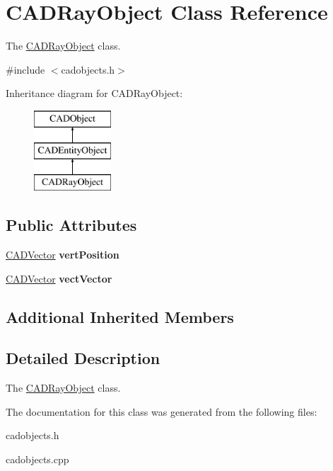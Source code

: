 \hypertarget{class_c_a_d_ray_object}{}\section{C\+A\+D\+Ray\+Object Class Reference}
\label{class_c_a_d_ray_object}


The \hyperlink{class_c_a_d_ray_object}{C\+A\+D\+Ray\+Object} class.  




{\ttfamily \#include $<$cadobjects.\+h$>$}

Inheritance diagram for C\+A\+D\+Ray\+Object\+:\begin{figure}[H]
\begin{center}
\leavevmode
\includegraphics[height=3.000000cm]{class_c_a_d_ray_object}
\end{center}
\end{figure}
\subsection*{Public Attributes}
\begin{DoxyCompactItemize}
\item 
\hyperlink{class_c_a_d_vector}{C\+A\+D\+Vector} {\bfseries vert\+Position}\hypertarget{class_c_a_d_ray_object_a97a9acf4313b44ae2b9a66ba5261d5de}{}\label{class_c_a_d_ray_object_a97a9acf4313b44ae2b9a66ba5261d5de}

\item 
\hyperlink{class_c_a_d_vector}{C\+A\+D\+Vector} {\bfseries vect\+Vector}\hypertarget{class_c_a_d_ray_object_ad0056289cb08edea8b3825687a015e62}{}\label{class_c_a_d_ray_object_ad0056289cb08edea8b3825687a015e62}

\end{DoxyCompactItemize}
\subsection*{Additional Inherited Members}


\subsection{Detailed Description}
The \hyperlink{class_c_a_d_ray_object}{C\+A\+D\+Ray\+Object} class. 

The documentation for this class was generated from the following files\+:\begin{DoxyCompactItemize}
\item 
cadobjects.\+h\item 
cadobjects.\+cpp\end{DoxyCompactItemize}
